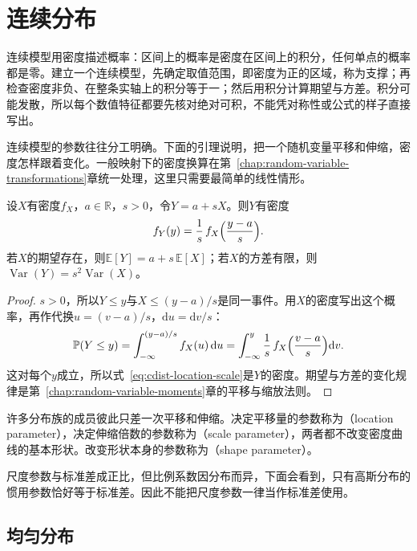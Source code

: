 \section{连续分布}
\label{sec:cdist-continuous}

连续模型用密度描述概率：区间上的概率是密度在区间上的积分，任何单点的概率都是零。建立一个连续模型，先确定取值范围，即密度为正的区域，称为支撑；再检查密度非负、在整条实轴上的积分等于一；然后用积分计算期望与方差。积分可能发散，所以每个数值特征都要先核对绝对可积，不能凭对称性或公式的样子直接写出。

连续模型的参数往往分工明确。下面的引理说明，把一个随机变量平移和伸缩，密度怎样跟着变化。一般映射下的密度换算在第~\ref{chap:random-variable-transformations}章统一处理，这里只需要最简单的线性情形。

\begin{lemma}[平移与伸缩]
\label{lem:cdist-location-scale}
设$X$有密度$f_X$，$a\in\mathbb{R}$，$s>0$，令$Y=a+sX$。则$Y$有密度
\begin{equation}
  f_Y(y)=\frac1s\,f_X\Bigl(\frac{y-a}{s}\Bigr).
  \label{eq:cdist-location-scale}
\end{equation}
若$X$的期望存在，则$\mathbb{E}[Y]=a+s\,\mathbb{E}[X]$；若$X$的方差有限，则$\operatorname{Var}(Y)=s^{2}\operatorname{Var}(X)$。
\end{lemma}

\begin{proof}
$s>0$，所以$Y\leq y$与$X\leq(y-a)/s$是同一事件。用$X$的密度写出这个概率，再作代换$u=(v-a)/s$，$\mathrm{d}u=\mathrm{d}v/s$：
\[
  \mathbb{P}(Y\leq y)=\int_{-\infty}^{(y-a)/s}f_X(u)\,\mathrm{d}u
  =\int_{-\infty}^{y}\frac1s\,f_X\Bigl(\frac{v-a}{s}\Bigr)\mathrm{d}v .
\]
这对每个$y$成立，所以式~\eqref{eq:cdist-location-scale}是$Y$的密度。期望与方差的变化规律是第~\ref{chap:random-variable-moments}章的平移与缩放法则。
\end{proof}

许多分布族的成员彼此只差一次平移和伸缩。决定平移量的参数称为（location parameter），决定伸缩倍数的参数称为（scale parameter），两者都不改变密度曲线的基本形状。改变形状本身的参数称为（shape parameter）。

尺度参数与标准差成正比，但比例系数因分布而异，下面会看到，只有高斯分布的惯用参数恰好等于标准差。因此不能把尺度参数一律当作标准差使用。

\subsection{均匀分布}
\label{sec:cdist-uniform}

